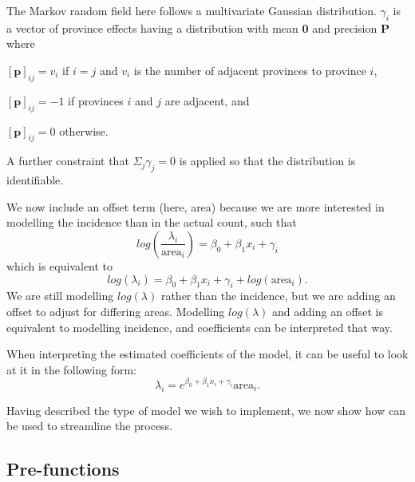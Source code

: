 The Markov random field here follows a multivariate Gaussian
distribution. \(\gamma_i\) is a vector of province effects having a
distribution with mean \textbf{0} and precision \textbf{P} where

\([\textbf{p}]_{ij} = v_i\) if \(i=j\) and \(v_i\) is the number of adjacent provinces
to province \(i\),

\([\textbf{p}]_{ij} = -1\) if provinces \(i\) and \(j\) are adjacent, and

\([\textbf{p}]_{ij} = 0\) otherwise.

A further constraint that \(\Sigma_j \gamma_j = 0\) is applied so that the
distribution is identifiable.

We now include an offset term (here, area) because we are more interested
in modelling the incidence than in the actual count, such that
\begin{equation}
log(\frac{\lambda_i} {\text{area}_i}) = \beta_0 + \beta_1x_i + \gamma_i
\label{eq:eq6}
\end{equation}
which is equivalent to
\begin{equation}
log(\lambda_i) = \beta_0 + \beta_1x_i + \gamma_i + log(\text{area}_i).
\label{eq:eq7}
\end{equation}
We are still modelling \(log(\lambda)\) rather than the incidence, but we
are adding an offset to adjust for differing areas. Modelling \(log(\lambda)\) and adding an offset is equivalent to
modelling incidence, and coefficients can be interpreted that way.

When interpreting the estimated coefficients of the model, it can be
useful to look at it in the following form:
\begin{equation}
\lambda_i = e^{\beta_0 + \beta_1 x_i + \gamma_i} \text{area}_i.
\label{eq:eq8}
\end{equation}

Having described the type of model we wish to implement, we now show how  can be used to streamline the process.

\hypertarget{pre-functions-1}{%
\subsection{Pre-functions}\label{pre-functions-1}}

